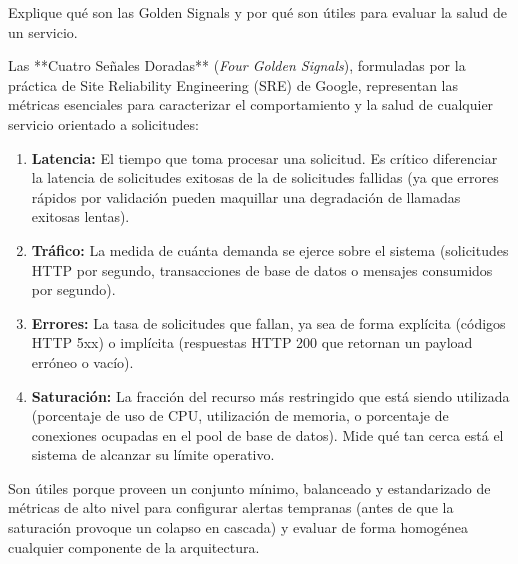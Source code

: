 \documentclass[variant=guia,cover=institutional,mode=screen]{ua-engineering-v6-article}
\begin{document}
\begin{uaexercise}
Explique qué son las Golden Signals y por qué son útiles para evaluar la salud de un servicio.
\end{uaexercise}
\begin{uaanswer}
Las **Cuatro Señales Doradas** (\emph{Four Golden Signals}), formuladas por la práctica de Site Reliability Engineering (SRE) de Google, representan las métricas esenciales para caracterizar el comportamiento y la salud de cualquier servicio orientado a solicitudes:
\begin{enumerate}
\item \textbf{Latencia:} El tiempo que toma procesar una solicitud. Es crítico diferenciar la latencia de solicitudes exitosas de la de solicitudes fallidas (ya que errores rápidos por validación pueden maquillar una degradación de llamadas exitosas lentas).
\item \textbf{Tráfico:} La medida de cuánta demanda se ejerce sobre el sistema (solicitudes HTTP por segundo, transacciones de base de datos o mensajes consumidos por segundo).
\item \textbf{Errores:} La tasa de solicitudes que fallan, ya sea de forma explícita (códigos HTTP 5xx) o implícita (respuestas HTTP 200 que retornan un payload erróneo o vacío).
\item \textbf{Saturación:} La fracción del recurso más restringido que está siendo utilizada (porcentaje de uso de CPU, utilización de memoria, o porcentaje de conexiones ocupadas en el pool de base de datos). Mide qué tan cerca está el sistema de alcanzar su límite operativo.
\end{enumerate}
Son útiles porque proveen un conjunto mínimo, balanceado y estandarizado de métricas de alto nivel para configurar alertas tempranas (antes de que la saturación provoque un colapso en cascada) y evaluar de forma homogénea cualquier componente de la arquitectura.
\end{uaanswer}
\end{document}
